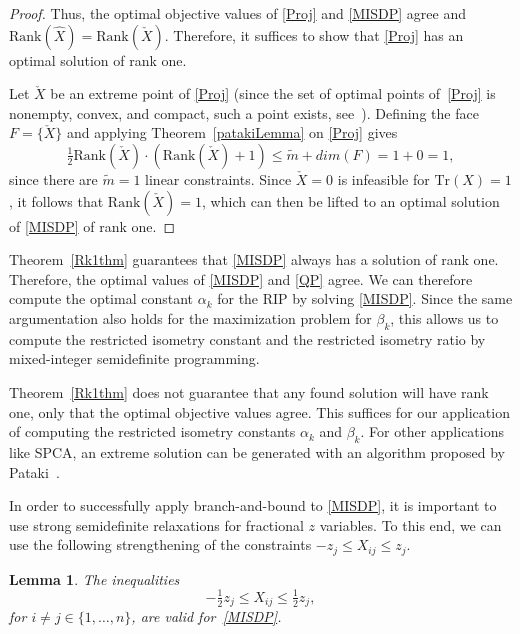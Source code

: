 \documentclass[journal]{IEEEtran}
\newtheorem{lemma}[theorem]{Lemma}
\newcommand{\Tr}{\text{Tr}}
\newcommand{\Rk}{\text{Rank}}
\begin{document}
\begin{proof}
  Thus, the optimal objective values of \eqref{Proj} and \eqref{MISDP}
  agree and $\Rk(\hat{X}) = \Rk(\check{X})$.  Therefore, it
  suffices to show that \eqref{Proj} has an optimal solution of rank one.

  Let $\check{X}$ be an extreme point of \eqref{Proj} (since the set of
  optimal points of~\eqref{Proj} is nonempty, convex, and compact, such a
  point exists, see~\cite[Corollary 18.5.1]{Roc70}). Defining the face $F =
  \{\check{X}\}$ and applying Theorem~\ref{patakiLemma} on \eqref{Proj}
  gives
  \begin{equation*}
    \tfrac{1}{2} \Rk(\check{X}) \cdot (\Rk(\check{X})+1) \leq \tilde{m} + dim(F) = 1 + 0 = 1,
  \end{equation*}
  since there are $\tilde{m} = 1$ linear constraints. Since $\check{X} = 0$
  is infeasible for $\Tr(X) = 1$, it follows that $\Rk(\check{X}) = 1$,
  which can then be lifted to an optimal solution of \eqref{MISDP} of rank
  one.
\end{proof}

Theorem~\ref{Rk1thm} guarantees that \eqref{MISDP} always has a solution of
rank one. Therefore, the optimal values of \eqref{MISDP} and \eqref{QP}
agree. We can therefore compute the optimal constant $\alpha_k$ for the RIP
by solving \eqref{MISDP}. Since the same argumentation also holds for the
maximization problem for $\beta_k$, this allows us to compute the
restricted isometry constant and the restricted isometry ratio by
mixed-integer semidefinite programming.

Theorem~\ref{Rk1thm} does not guarantee that any
found solution will have rank one, only that the optimal objective
values agree. This suffices for our application of
computing the restricted isometry constants $\alpha_k$ and $\beta_k$. For other
applications like SPCA, an extreme solution can be generated with an
algorithm proposed by Pataki~\cite{coneLP}.

In order to successfully apply branch-and-bound to \eqref{MISDP}, it is
important to use strong semidefinite relaxations for fractional $z$
variables. To this end, we can use the following strengthening of the
constraints $-z_j \leq X_{ij} \leq z_j$.

\begin{lemma}\label{HalfConstraint} 
  The inequalities
  \begin{equation}\label{eq:HalfConstraint}
    -\tfrac{1}{2} z_j \leq X_{ij} \leq \tfrac{1}{2} z_j,
  \end{equation}
  for $i \neq j \in \{1, \dots, n\}$, are valid for~\eqref{MISDP}.
\end{lemma}
\end{document}
